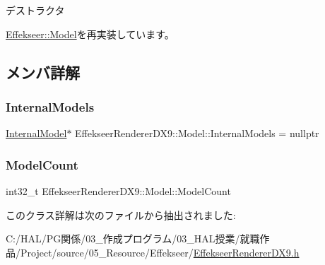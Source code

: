 デストラクタ 



\mbox{\hyperlink{class_effekseer_1_1_model_a02266837426d39149d3eb56da7051c98}{Effekseer\+::\+Model}}を再実装しています。



\subsection{メンバ詳解}
\mbox{\label{class_effekseer_renderer_d_x9_1_1_model_a712d95cfe8c2223a708038c7132e60f5}} 
\subsubsection{\texorpdfstring{Internal\+Models}{InternalModels}}
{\footnotesize\ttfamily \mbox{\hyperlink{struct_effekseer_renderer_d_x9_1_1_model_1_1_internal_model}{Internal\+Model}}$\ast$ Effekseer\+Renderer\+D\+X9\+::\+Model\+::\+Internal\+Models = nullptr}

\mbox{\label{class_effekseer_renderer_d_x9_1_1_model_a993f041558265db631654723ca973e0a}} 
\subsubsection{\texorpdfstring{Model\+Count}{ModelCount}}
{\footnotesize\ttfamily int32\+\_\+t Effekseer\+Renderer\+D\+X9\+::\+Model\+::\+Model\+Count}



このクラス詳解は次のファイルから抽出されました\+:\begin{DoxyCompactItemize}
\item 
C\+:/\+H\+A\+L/\+P\+G関係/03\+\_\+作成プログラム/03\+\_\+\+H\+A\+L授業/就職作品/\+Project/source/05\+\_\+\+Resource/\+Effekseer/\mbox{\hyperlink{_effekseer_renderer_d_x9_8h}{Effekseer\+Renderer\+D\+X9.\+h}}\end{DoxyCompactItemize}
